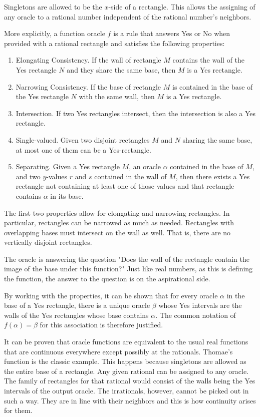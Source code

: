 \documentclass[12pt]{article}
\theoremstyle{remark}
\begin{document}
Singletons are allowed to be the $x$-side of a rectangle. This allows the assigning of any oracle to a rational number independent of the rational number's neighbors.

More explicitly, a function oracle $f$ is a rule that answers Yes or No when provided with a rational rectangle and satisfies the following properties: 
\begin{enumerate}
    \item Elongating Consistency. If the wall of rectangle $M$ contains the wall of the Yes rectangle $N$ and they share the same base, then $M$ is a Yes rectangle. 
    \item Narrowing Consistency. If the base of rectangle $M$ is contained in the base of the Yes rectangle $N$ with the same wall, then $M$ is a Yes rectangle.  
    \item Intersection. If two Yes rectangles intersect, then the intersection is also a Yes rectangle. 
    \item Single-valued. Given two disjoint rectangles $M$ and $N$ sharing the same base, at most one of them can be a Yes-rectangle. 
    \item Separating. Given a Yes rectangle $M$, an oracle $\alpha$ contained in the base of $M$, and two $y$-values $r$ and $s$ contained in the wall of $M$, then there exists a Yes rectangle not containing at least one of those values and that rectangle contains $\alpha$ in its base.
\end{enumerate} 

The first two properties allow for elongating and narrowing rectangles. In particular, rectangles can be narrowed as much as needed. Rectangles with overlapping bases must intersect on the wall as well. That is, there are no vertically disjoint rectangles. 

The oracle is answering the question "Does the wall of the rectangle contain the image of the base under this function?" Just like real numbers, as this is defining the function, the answer to the question is on the aspirational side. 

By working with the properties, it can be shown that for every oracle $\alpha$ in the base of a Yes rectangle, there is a unique oracle $\beta$ whose Yes intervals are the walls of the Yes rectangles whose base contains $\alpha$. The common notation of $f(\alpha) = \beta$ for this association is therefore justified. 

It can be proven that oracle functions are equivalent to the usual real functions that are continuous everywhere except possibly at the rationals. Thomae's function is the classic example. This happens because singletons are allowed as the entire base of a rectangle. Any given rational can be assigned to any oracle. The family of rectangles for that rational would consist of the walls being the Yes intervals of the output oracle. The irrationals, however, cannot be picked out in such a way. They are in line with their neighbors and this is how continuity arises for them.
\end{document}
